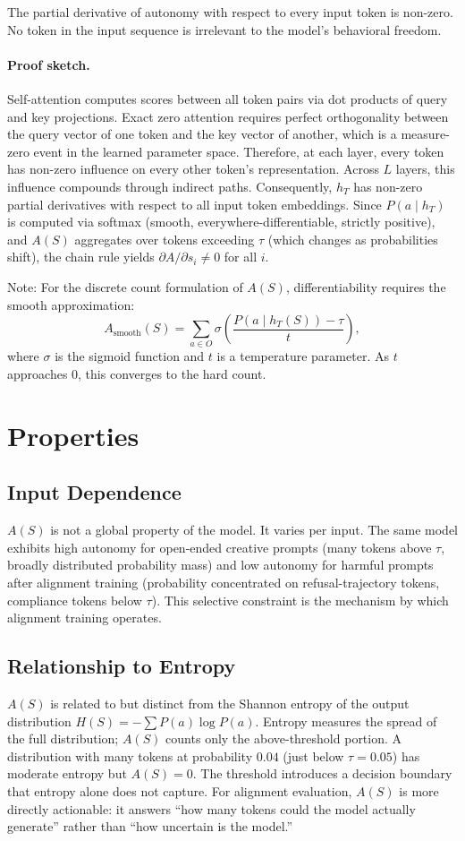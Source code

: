 \documentclass[11pt,letterpaper]{article}
\begin{document}
The partial derivative of autonomy with respect to every input token is non-zero. No token in the input sequence is irrelevant to the model's behavioral freedom.

\paragraph{Proof sketch.} Self-attention computes scores between all token pairs via dot products of query and key projections. Exact zero attention requires perfect orthogonality between the query vector of one token and the key vector of another, which is a measure-zero event in the learned parameter space. Therefore, at each layer, every token has non-zero influence on every other token's representation. Across $L$ layers, this influence compounds through indirect paths. Consequently, $h_T$ has non-zero partial derivatives with respect to all input token embeddings. Since $P(a\mid h_T)$ is computed via softmax (smooth, everywhere-differentiable, strictly positive), and $A(S)$ aggregates over tokens exceeding $\tau$ (which changes as probabilities shift), the chain rule yields $\partial A/\partial s_i\neq 0$ for all $i$.

Note: For the discrete count formulation of $A(S)$, differentiability requires the smooth approximation:
\begin{equation}
A_{\mathrm{smooth}}(S)=\sum_{a\in O}\sigma\!\left(\frac{P(a\mid h_T(S))-\tau}{t}\right),
\end{equation}
where $\sigma$ is the sigmoid function and $t$ is a temperature parameter. As $t$ approaches 0, this converges to the hard count.

\section{Properties}
\subsection{Input Dependence}
$A(S)$ is not a global property of the model. It varies per input. The same model exhibits high autonomy for open-ended creative prompts (many tokens above $\tau$, broadly distributed probability mass) and low autonomy for harmful prompts after alignment training (probability concentrated on refusal-trajectory tokens, compliance tokens below $\tau$). This selective constraint is the mechanism by which alignment training operates.

\subsection{Relationship to Entropy}
$A(S)$ is related to but distinct from the Shannon entropy of the output distribution $H(S)=-\sum P(a)\log P(a)$. Entropy measures the spread of the full distribution; $A(S)$ counts only the above-threshold portion. A distribution with many tokens at probability $0.04$ (just below $\tau=0.05$) has moderate entropy but $A(S)=0$. The threshold introduces a decision boundary that entropy alone does not capture. For alignment evaluation, $A(S)$ is more directly actionable: it answers ``how many tokens could the model actually generate'' rather than ``how uncertain is the model.''
\end{document}
